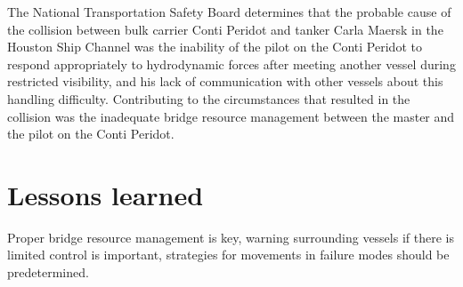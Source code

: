 The National Transportation Safety Board determines that the probable cause of the collision between bulk carrier Conti Peridot and tanker Carla Maersk in the Houston Ship Channel was the inability of the pilot on the Conti Peridot to respond appropriately to hydrodynamic forces after meeting another vessel during restricted visibility, and his lack of communication with other vessels about this handling difficulty. Contributing to the circumstances that resulted in the collision was the inadequate bridge resource management between the master and the pilot on the Conti Peridot. \cite{NTSB2016}\cite{NTSB2016a}

\section{Lessons learned}
Proper bridge resource management is key, warning surrounding vessels if there is limited control is important, strategies for movements in failure modes should be predetermined.



